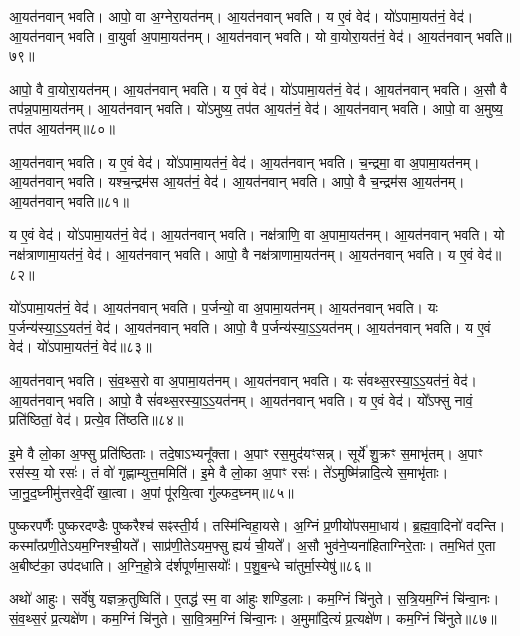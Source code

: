 आ॒यत॑नवान्‌ भवति। आपो॒ वा अ॒ग्नेरा॒यत॑नम्। 
आ॒यत॑नवान्‌ भवति। य ए॒वं वेद॑। 
यो॑ऽपामा॒यत॑नं॒ वेद॑। आ॒यत॑नवान्‌ भवति। 
वा॒युर्वा अ॒पामा॒यत॑नम्। आ॒यत॑नवान्‌ भवति। 
यो वा॒योरा॒यत॑नं॒ वेद॑। आ॒यत॑नवान्‌ भवति॥७९॥


आपो॒ वै वा॒योरा॒यत॑नम्। आ॒यत॑नवान्‌ भवति। 
य ए॒वं वेद॑। यो॑ऽपामा॒यत॑नं॒ वेद॑। 
आ॒यत॑नवान्‌ भवति। अ॒सौ वै तप॑न्न॒पामा॒यत॑नम्। 
आ॒यत॑नवान्‌ भवति। यो॑ऽमुष्य॒ तप॑त आ॒यत॑नं॒ वेद॑। 
आ॒यत॑नवान्‌ भवति। आपो॒ वा अ॒मुष्य॒ तप॑त आ॒यत॑नम्॥८०॥


आ॒यत॑नवान्‌ भवति। य ए॒वं वेद॑। 
यो॑ऽपामा॒यत॑नं॒ वेद॑। आ॒यत॑नवान्‌ भवति। 
च॒न्द्रमा॒ वा अ॒पामा॒यत॑नम्। आ॒यत॑नवान्‌ भवति। 
यश्च॒न्द्रम॑स आ॒यत॑नं॒ वेद॑। आ॒यत॑नवान्‌ भवति। 
आपो॒ वै च॒न्द्रम॑स आ॒यत॑नम्। आ॒यत॑नवान्‌ भवति॥८१॥


य ए॒वं वेद॑। यो॑ऽपामा॒यत॑नं॒ वेद॑। 
आ॒यत॑नवान्‌ भवति। नक्ष॑त्राणि॒ वा अ॒पामा॒यत॑नम्। 
आ॒यत॑नवान्‌ भवति। यो नक्ष॑त्राणामा॒यत॑नं॒ वेद॑। 
आ॒यत॑नवान्‌ भवति। आपो॒ वै नक्ष॑त्राणामा॒यत॑नम्। 
आ॒यत॑नवान्‌ भवति। य ए॒वं वेद॑॥८२॥


यो॑ऽपामा॒यत॑नं॒ वेद॑। आ॒यत॑नवान्‌ भवति।
प॒र्जन्यो॒ वा अ॒पामा॒यत॑नम्। आ॒यत॑नवान्‌ भवति। 
यः प॒र्जन्य॑स्या॒ऽ॒ऽ॒यत॑नं॒ वेद॑। आ॒यत॑नवान्‌ भवति। 
आपो॒ वै प॒र्जन्य॑स्या॒ऽ॒ऽ॒यत॑नम्। आ॒यत॑नवान्‌ भवति। 
य ए॒वं वेद॑। यो॑ऽपामा॒यत॑नं॒ वेद॑॥८३॥


आ॒यत॑नवान्‌ भवति। सं॒व॒थ्स॒रो वा अ॒पामा॒यत॑नम्। 
आ॒यत॑नवान्‌ भवति। यः सं॑वथ्स॒रस्या॒ऽ॒ऽ॒यत॑नं॒ वेद॑। 
आ॒यत॑नवान्‌ भवति। आपो॒ वै सं॑वथ्स॒रस्या॒ऽ॒ऽ॒यत॑नम्। 
आ॒यत॑नवान्‌ भवति। य ए॒वं वेद॑। 
यो᳚ऽफ्सु नावं॒ प्रति॑ष्ठितां॒ वेद॑। प्रत्ये॒व ति॑ष्ठति॥८४॥


इ॒मे वै लो॒का अ॒फ्सु प्रति॑ष्ठिताः। तदे॒षाऽभ्यनू᳚क्ता। 
अ॒पाꣳ रस॒मुद॑यꣳसन्न्। सूर्ये॑ शु॒क्रꣳ स॒माभृ॑तम्। 
अ॒पाꣳ रस॑स्य॒ यो रसः॑। तं वो॑ गृह्णाम्युत्त॒ममिति॑। 
इ॒मे वै लो॒का अ॒पाꣳ रसः॑। ते॑ऽमुष्मि॑न्नादि॒त्ये स॒माभृ॑ताः। 
जा॒नु॒द॒घ्नीमु॑त्तर\-वे॒दीं खा॒त्वा। अ॒पां पू॑रयि॒त्वा गु॑ल्फद॒घ्नम्॥८५॥


पुष्करपर्णैः पुष्करदण्डैः पुष्करैश्च॑ सꣴस्ती॒र्य। तस्मि॑न्वि\-हा॒यसे। 
अ॒ग्निं प्र॒णीयो॑पसमा॒धाय॑। ब्र॒ह्म॒वा॒दिनो॑ वदन्ति। 
कस्मा᳚त्प्रणी॒ते\-ऽयम॒ग्निश्ची॒यते᳚। साप्र॑णी॒तेऽयम॒फ्सु ह्ययं॑ ची॒यते᳚। 
अ॒सौ भुव॑ने॒प्यना॑हिताग्निरे॒ताः। तम॒भित॑ ए॒ता अ॒बीष्ट॑का॒ उप॑दधाति। 
अ॒ग्नि॒हो॒त्रे द॑र्शपूर्णमा॒सयोः᳚। प॒शु॒ब॒न्धे चा॑तुर्मा॒स्येषु॑॥८६॥


अथो॑ आहुः। सर्वे॑षु यज्ञक्र॒तुष्विति॑। 
ए॒तद्ध॑ स्म॒ वा आ॑हुः शण्डि॒लाः। कम॒ग्निं चि॑नुते। 
स॒त्रि॒यम॒ग्निं चि॑न्वा॒नः। सं॒व॒थ्स॒रं प्र॒त्यक्षे॑ण। 
कम॒ग्निं चि॑नुते। सा॒वि॒त्रम॒ग्निं चि॑न्वा॒नः। 
अ॒मुमा॑दि॒त्यं प्र॒त्यक्षे॑ण। कम॒ग्निं चि॑नुते॥८७॥


